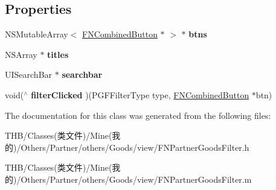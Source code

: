\subsection*{Properties}
\begin{DoxyCompactItemize}
\item 
\mbox{\label{interface_f_n_partner_goods_filter_ae5729ee8c60f41e270877c77b5e7ec5e}} 
N\+S\+Mutable\+Array$<$ \mbox{\hyperlink{interface_f_n_combined_button}{F\+N\+Combined\+Button}} $\ast$ $>$ $\ast$ {\bfseries btns}
\item 
\mbox{\label{interface_f_n_partner_goods_filter_a88218a46ab7358a43a7cf4f30fd0f382}} 
N\+S\+Array $\ast$ {\bfseries titles}
\item 
\mbox{\label{interface_f_n_partner_goods_filter_aca6861d5dcbf5506dfa31edcdeb4a5e5}} 
U\+I\+Search\+Bar $\ast$ {\bfseries searchbar}
\item 
\mbox{\label{interface_f_n_partner_goods_filter_a95a16682888b4bbe001f82178aeb6941}} 
void($^\wedge$ {\bfseries filter\+Clicked} )(P\+G\+F\+Filter\+Type type, \mbox{\hyperlink{interface_f_n_combined_button}{F\+N\+Combined\+Button}} $\ast$btn)
\end{DoxyCompactItemize}


The documentation for this class was generated from the following files\+:\begin{DoxyCompactItemize}
\item 
T\+H\+B/\+Classes(类文件)/\+Mine(我的)/\+Others/\+Partner/others/\+Goods/view/F\+N\+Partner\+Goods\+Filter.\+h\item 
T\+H\+B/\+Classes(类文件)/\+Mine(我的)/\+Others/\+Partner/others/\+Goods/view/F\+N\+Partner\+Goods\+Filter.\+m\end{DoxyCompactItemize}
